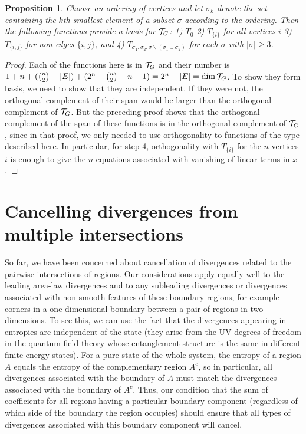 \documentclass[12pt]{article}
\newtheorem{proposition}[theorem]{Proposition}
\theoremstyle{definition}
\begin{document}
\begin{proposition}
    Choose an ordering of vertices and let $\sigma_k$ denote the set containing the $k$th smallest element of a subset $\sigma$ according to the ordering. Then the following functions provide a basis for ${\cal T}_G$: 1) $T_0$  2) $T_{\{i\}}$ for all vertices $i$ 3) $T_{\{i,j\}}$ for non-edges $\{i,j\}$, and 4) $T_{\sigma_1,\sigma_2, \sigma \backslash (\sigma_1 \cup \sigma_2)}$ for each $\sigma$ with $|\sigma| \ge 3$.
\end{proposition}
\begin{proof}
    Each of the functions here is in ${\cal T}_G$ and their number is $1 + n + (\binom{n}{2} - |E|) + (2^n - \binom{n}{2} - n - 1) = 2^n - |E| = \dim{\cal T}_G$. To show they form basis, we need to show that they are independent. If they were not, the orthogonal complement of their span would be larger than the orthogonal complement of ${\cal T}_G$. But the preceding proof shows that the orthogonal complement of the span of these functions is in the orthogonal complement of ${\cal T}_G$, since in that proof, we only needed to use orthogonality to functions of the type described here. In particular, for step 4, orthogonality with $T_{\{i\}}$ for the $n$ vertices $i$ is enough to give the $n$ equations associated with vanishing of linear terms in $x$. 
\end{proof}

\section{Cancelling divergences from multiple intersections}

So far, we have been concerned about cancellation of divergences related to the pairwise intersections of regions. Our considerations apply equally well to the leading area-law divergences and to any subleading divergences or divergences associated with non-smooth features of these boundary regions, for example corners in a one dimensional boundary between a pair of regions in two dimensions. To see this, we can use the fact that the divergences appearing in entropies are independent of the state (they arise from the UV degrees of freedom in the quantum field theory whose entanglement structure is the same in different finite-energy states). For a pure state of the whole system, the entropy of a region $A$ equals the entropy of the complementary region $A^c$, so in particular, all divergences associated with the boundary of $A$ must match the divergences associated with the boundary of $A^c$. Thus, our condition that the sum of coefficients for all regions having a particular boundary component (regardless of which side of the boundary the region occupies) should ensure that all types of divergences associated with this boundary component will cancel. 
\end{document}
